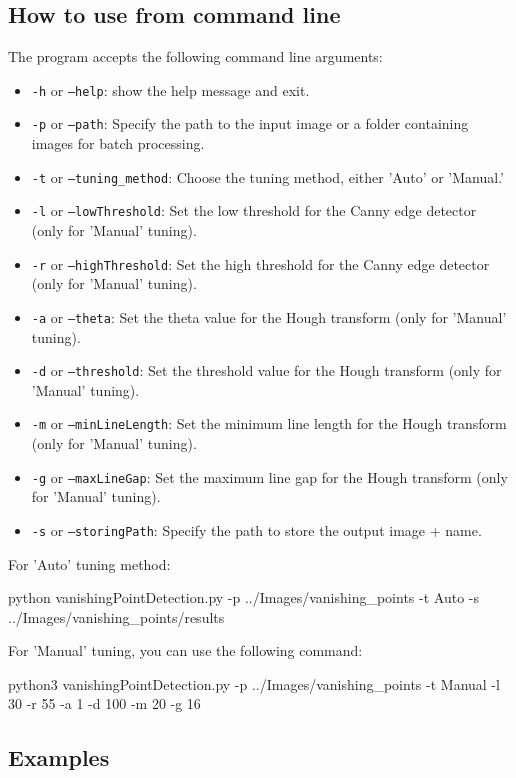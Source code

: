 \subsection{How to use from command line}
The program accepts the following command line arguments:
\begin{itemize}
    \item \texttt{-h} or \texttt{--help}: show the help message and exit.
    \item \texttt{-p} or \texttt{--path}: Specify the path to the input image or a folder containing images for batch processing.
    \item \texttt{-t} or \texttt{--tuning\_method}: Choose the tuning method, either 'Auto' or 'Manual.'
    \item \texttt{-l} or \texttt{--lowThreshold}: Set the low threshold for the Canny edge detector (only for 'Manual' tuning).
    \item \texttt{-r} or \texttt{--highThreshold}: Set the high threshold for the Canny edge detector (only for 'Manual' tuning).
    \item \texttt{-a} or \texttt{--theta}: Set the theta value for the Hough transform (only for 'Manual' tuning).
    \item \texttt{-d} or \texttt{--threshold}: Set the threshold value for the Hough transform (only for 'Manual' tuning).
    \item \texttt{-m} or \texttt{--minLineLength}: Set the minimum line length for the Hough transform (only for 'Manual' tuning).
    \item \texttt{-g} or \texttt{--maxLineGap}: Set the maximum line gap for the Hough transform (only for 'Manual' tuning).
    \item \texttt{-s} or \texttt{--storingPath}: Specify the path to store the output image + name.
\end{itemize}
\noindent
For ’Auto’ tuning method:
\begin{bashscript}
    python vanishingPointDetection.py -p ../Images/vanishing_points  -t Auto -s ../Images/vanishing_points/results
\end{bashscript}
For ’Manual’ tuning, you can use the following command:
\begin{bashscript}
    python3 vanishingPointDetection.py -p ../Images/vanishing_points  -t Manual -l 30 -r 55 -a 1 -d 100 -m 20 -g 16
\end{bashscript}

\subsection{Examples}

